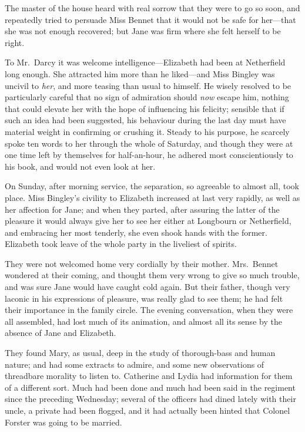 The master of the house heard with real sorrow that they were
to go so soon, and repeatedly tried to persuade Miss Bennet that
it would not be safe for her---that she was not enough recovered;
but Jane was firm where she felt herself to be right.

To Mr.\ Darcy it was welcome intelligence---Elizabeth had been
at Netherfield long enough.  She attracted him more than he
liked---and Miss Bingley was uncivil to \emph{her}, and more teasing
than usual to himself.  He wisely resolved to be particularly
careful that no sign of admiration should \emph{now} escape him,
nothing that could elevate her with the hope of influencing his
felicity; sensible that if such an idea had been suggested,
his behaviour during the last day must have material weight in
confirming or crushing it.  Steady to his purpose, he scarcely
spoke ten words to her through the whole of Saturday, and
though they were at one time left by themselves for half-an-hour,
he adhered most conscientiously to his book, and would not
even look at her.

On Sunday, after morning service, the separation, so agreeable
to almost all, took place.  Miss Bingley's civility to Elizabeth
increased at last very rapidly, as well as her affection for Jane;
and when they parted, after assuring the latter of the pleasure
it would always give her to see her either at Longbourn or
Netherfield, and embracing her most tenderly, she even shook
hands with the former.  Elizabeth took leave of the whole party
in the liveliest of spirits.

They were not welcomed home very cordially by their mother.
Mrs.\ Bennet wondered at their coming, and thought them very
wrong to give so much trouble, and was sure Jane would have
caught cold again.  But their father, though very laconic in his
expressions of pleasure, was really glad to see them; he had felt
their importance in the family circle.  The evening conversation,
when they were all assembled, had lost much of its animation,
and almost all its sense by the absence of Jane and Elizabeth.

They found Mary, as usual, deep in the study of thorough-bass
and human nature; and had some extracts to admire, and some
new observations of threadbare morality to listen to.  Catherine
and Lydia had information for them of a different sort.  Much
had been done and much had been said in the regiment since the
preceding Wednesday; several of the officers had dined lately
with their uncle, a private had been flogged, and it had actually
been hinted that Colonel Forster was going to be married.



